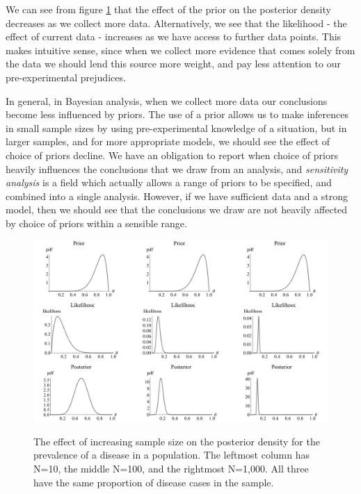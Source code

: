 \documentclass[11pt,fullpage]{book}
\begin{document}
We can see from figure \ref{fig:Prior_weakPriorEffect} that the effect of the prior on the posterior density decreases as we collect more data. Alternatively, we see that the likelihood - the effect of current data  - increases as we have access to further data points. This makes intuitive sense, since when we collect more evidence that comes solely from the data we should lend this source more weight, and pay less attention to our pre-experimental prejudices.

In general, in Bayesian analysis, when we collect more data our conclusions become less influenced by priors. The use of a prior allows us to make inferences in small sample sizes by using pre-experimental knowledge of a situation, but in larger samples, and for more appropriate models, we should see the effect of choice of priors decline. We have an obligation to report when choice of priors heavily influences the conclusions that we draw from an analysis, and \textit{sensitivity analysis} is a field which actually allows a range of priors to be specified, and combined into a single analysis. However, if we have sufficient data and a strong model, then we should see that the conclusions we draw are not heavily affected by choice of priors within a sensible range.

\begin{figure}
\centering
\scalebox{0.40} 
{\includegraphics{Prior_weakPriorEffect.pdf}}\caption{The effect of increasing sample size on the posterior density for the prevalence of a disease in a population. The leftmost column has N=10, the middle N=100, and the rightmost N=1,000. All three have the same proportion of disease cases in the sample.}\label{fig:Prior_weakPriorEffect}
\end{figure}
\end{document}
